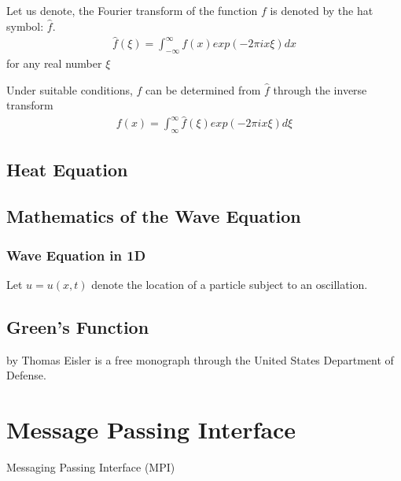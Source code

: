 \documentclass[letterpaper,10pt,english]{sphinxmanual}
\begin{document}
Let us denote, the Fourier transform of the function \(f\) is denoted by the hat symbol: \(\hat{f}\).
\begin{equation*}
\begin{split}\hat{f}(\xi) = \int_{-\infty}^{\infty} f(x) exp(-2 \pi i x \xi) dx\end{split}
\end{equation*}
for any real number \(\xi\)

Under suitable conditions, \(f\) can be determined from \(\hat{f}\) through the inverse transform
\begin{equation*}
\begin{split}f(x) = \int_{\infty}^{\infty} \hat{f}(\xi) exp(-2 \pi i x \xi) d \xi\end{split}
\end{equation*}

\subsection{Heat Equation}
\label{\detokenize{math/heat_equation:heat-equation}}\label{\detokenize{math/heat_equation::doc}}

\subsection{Mathematics of the Wave Equation}
\label{\detokenize{math/wave_equation:mathematics-of-the-wave-equation}}\label{\detokenize{math/wave_equation::doc}}

\subsubsection{Wave Equation in 1D}
\label{\detokenize{math/wave_equation:wave-equation-in-1d}}
Let \(u=u(x,t)\) denote the location of a particle subject to an oscillation.


\subsection{Green’s Function}
\label{\detokenize{math/greens_function:green-s-function}}\label{\detokenize{math/greens_function::doc}}
 by Thomas Eisler is a free monograph through the United States Department of Defense.


\section{Message Passing Interface}
\label{\detokenize{mpi/index:message-passing-interface}}\label{\detokenize{mpi/index::doc}}
Messaging Passing Interface (MPI)
\end{document}
